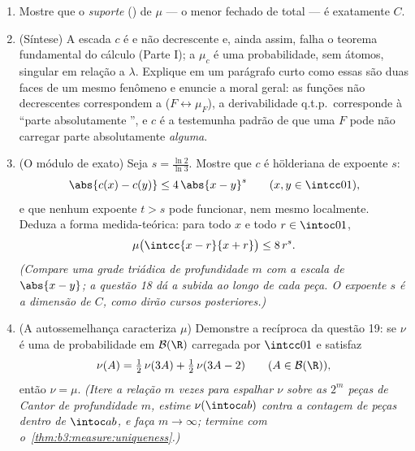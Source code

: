 \begin{problem}
\begin{enumerate}[resume]
\[        \]
        Compare com a lei uniforme em $\intcc01$ (variância $\frac1{12}$): a massa de
        Cantor, empurrada para as bordas, espalha-se \emph{mais}.
  \item Mostre que o \emph{suporte} () de $\mu$ --- o
        menor fechado de  total --- é exatamente $C$.
  \item (Síntese) A escada $c$ é  e não decrescente e, ainda
        assim, falha o teorema fundamental do cálculo (Parte I); a
         $\mu_c$ é uma probabilidade, sem átomos, singular em
        relação a $\lambda$. Explique em um parágrafo curto como essas são
        duas faces de um mesmo fenômeno e enuncie a moral geral: as
        funções não decrescentes correspondem a  ($F \leftrightarrow \mu_F$), a
        derivabilidade q.t.p.\ corresponde à ``parte absolutamente
        '', e $c$ é a testemunha padrão de que uma $F$
         pode não carregar parte absolutamente 
        \emph{alguma}.
  \item (O módulo de  exato) Seja $s =
        \frac{\ln 2}{\ln 3}$. Mostre que $c$
        é hölderiana de expoente $s$:
        \[
        \abs{c(x) - c(y)} \leq 4\,\abs{x - y}^{s}
        \qquad (x, y \in \intcc01),
        \]
        e que nenhum expoente $t > s$ pode funcionar, nem mesmo
        localmente. Deduza a forma medida-teórica: para todo $x$ e
        todo $r \in \intoc01$,
        \[
        \mu\bigl(\intcc{x - r}{x + r}\bigr) \leq 8\,r^{s} .
        \]
        \emph{(Compare uma grade triádica de profundidade $m$ com a
        escala de $\abs{x - y}$; a questão 18 dá a subida ao longo de cada
        peça. O expoente $s$ é a dimensão  de $C$,
        como dirão cursos posteriores.)}
  \item (A autossemelhança caracteriza $\mu$) Demonstre a recíproca
        da questão 19: se $\nu$ é uma  de probabilidade em
        $\mathcal B(\R)$ carregada por $\intcc01$ e satisfaz
        \[
        \nu(A) = \tfrac12\,\nu(3A) + \tfrac12\,\nu(3A - 2)
        \qquad (A \in \mathcal B(\R)),
        \]
        então $\nu = \mu$. \emph{(Itere a relação $m$ vezes para espalhar
        $\nu$ sobre as $2^m$ peças de Cantor de profundidade
        $m$, estime $\nu(\intoc ab)$ contra a contagem de peças dentro de
        $\intoc ab$, e faça $m \to \infty$; termine com o~\cref{thm:b3:measure:uniqueness}.)}
\end{enumerate}
\end{problem}
